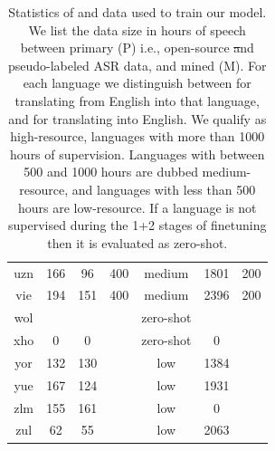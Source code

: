 \begin{table}[!htb]
\begin{minipage}[t]{0.45\textwidth}
\begin{tabular}{@{}ccccccc@{}}
        uzn & 166 & 96 & 400 & medium & 1801 & 200 \\
        vie & 194 & 151 & 400 & medium & 2396 & 200 \\
        wol &  &  &  & zero-shot &  &  \\
        xho & 0 & 0 &  & zero-shot & 0 &  \\
        yor & 132 & 130 &  & low & 1384 &  \\
        yue & 167 & 124 &  & low & 1931 &  \\
        zlm & 155 & 161 &  & low & 0 &  \\
        zul & 62 & 55 &  & low & 2063 &  \\
        \bottomrule
\end{tabular}
\end{minipage}
\caption{\small Statistics of \asr{} and \st{} data used to train our \mfourt{} model. We list the data size in hours of speech between primary (P) i.e.,
open-source \st and pseudo-labeled ASR data,
and mined (M). For each language we distinguish between \engx{} for translating from English into that language, and \xeng{} for translating into English.
We qualify as high-resource, languages with more than 1000 hours of supervision. Languages with between 500 and 1000 hours are dubbed medium-resource, and languages with less than 500 hours are low-resource. If a language is not supervised during the 1+2 stages of finetuning then it is evaluated as zero-shot.
}
\label{tbl:modeling:s2tdata}
\end{table}